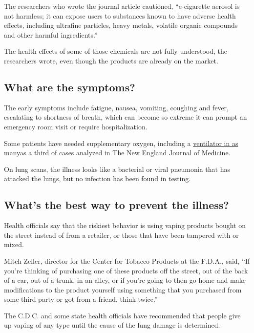 The researchers who wrote the journal article cautioned, ``e-cigarette
aerosol is not harmless; it can expose users to substances known to have
adverse health effects, including ultrafine particles, heavy metals,
volatile organic compounds and other harmful ingredients.''

The health effects of some of those chemicals are not fully understood,
the researchers wrote, even though the products are already on the
market.

\hypertarget{what-are-the-symptoms}{%
\subsection{What are the symptoms?}\label{what-are-the-symptoms}}

The early symptoms include fatigue, nausea, vomiting, coughing and
fever, escalating to shortness of breath, which can become so extreme it
can prompt an emergency room visit or require hospitalization.

Some patients have needed supplementary oxygen, including a
\href{https://www.nejm.org/doi/full/10.1056/NEJMoa1911614}{ventilator in
as many}\href{https://www.nejm.org/doi/full/10.1056/NEJMoa1911614}{as a
third} of cases analyzed in The New England Journal of Medicine.

On lung scans, the illness looks like a bacterial or viral pneumonia
that has attacked the lungs, but no infection has been found in testing.

\hypertarget{whats-the-best-way-to-prevent-the-illness}{%
\subsection{What's the best way to prevent the
illness?}\label{whats-the-best-way-to-prevent-the-illness}}

Health officials say that the riskiest behavior is using vaping products
bought on the street instead of from a retailer, or those that have been
tampered with or mixed.

Mitch Zeller, director for the Center for Tobacco Products at the
F.D.A., said, ``If you're thinking of purchasing one of these products
off the street, out of the back of a car, out of a trunk, in an alley,
or if you're going to then go home and make modifications to the product
yourself using something that you purchased from some third party or got
from a friend, think twice.''

The C.D.C. and some state health officials have recommended that people
give up vaping of any type until the cause of the lung damage is
determined.

